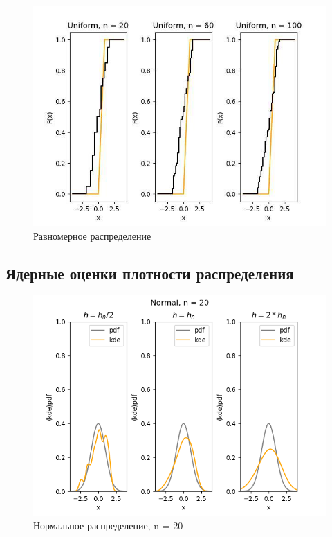 \documentclass[../body.tex]{subfiles}
\begin{document}
\begin{figure}[H]
	\centering
	\includegraphics[width=\textwidth, height =0.4\textheight]{img/UniformCDF.png}
	\caption{Равномерное распределение}
	\label{fig:uniform_cdf}
\end{figure}

\subsection{Ядерные оценки плотности распределения}
\begin{figure}[H]
	\centering
	\includegraphics[width=\textwidth, height =0.4\textheight]{img/NormalKDE n = 20.png}
	\caption{Нормальное распределение, n = 20}
	\label{fig:normal_kde_20}
\end{figure}
\end{document}
